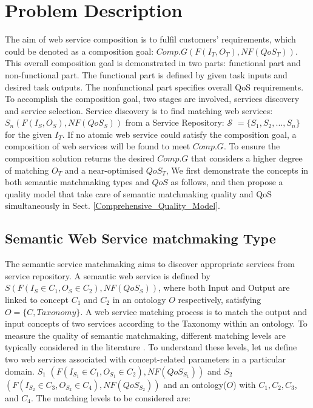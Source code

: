\documentclass{IEEEtran}
\begin{document}
\section{Problem Description}\label{problemDes}

The aim of web service composition is to fulfil customers' requirements, which could be denoted as a composition goal: $Comp.G(F(I_{T}, O_{T}), NF(QoS_{T}))$. This overall composition goal is demonstrated in two parts: functional part and non-functional part. The functional part is defined by given task inputs and desired task outputs. The nonfunctional part specifies overall QoS requirements. To accomplish the composition goal, two stages are involved, services discovery and service selection. Service discovery is to find matching web services: $S_{n}(F(I_{S}, O_{S}), NF(QoS_{S}))$ from a Service Repository: $\mathcal{S}$ $=  \{S_{1}, S_{2},..., S_{n} \}$ for the given $I_{T}$. If no atomic web service could satisfy the composition goal, a composition of web services will be found to meet $Comp.G$. To ensure the composition solution returns the desired $Comp.G$ that considers a higher degree of matching $O_{T}$ and a near-optimised $QoS_{T}$, We first demonstrate the concepts in both semantic matchmaking types and $QoS$ as follows, and then propose a quality model that take care of semantic matchmaking quality and QoS simultaneously in Sect. \ref{Comprehensive_Quality_Model}.


\subsection{Semantic Web Service matchmaking Type}\label{semantic Web service Discovery}
The semantic service matchmaking aims to discover appropriate services from service repository. A semantic web service is defined by $S(F(I_{S}\in C_{1}, O_{S}\in C_{2}), NF(QoS_{S}))$, where both Input and Output are linked to concept $C_{1}$ and $C_{2}$ in an ontology $O$ respectively, satisfying $O=\{C, Taxonomy\}$. A web service matching process is to match the output and input concepts of two services according to the Taxonomy within an ontology. To measure the quality of semantic matchmaking, different matching levels are typically considered in the literature \cite{paolucci2002semantic}. To understand these levels, let us define two web services associated with concept-related parameters in a particular domain. $S_{1}$ $(F(I_{S_1}\in C_{1}, O_{S_1}\in C_{2}), NF(QoS_{S_1}))$ and  $S_{2}$ $(F(I_{S_2}\in C_{3}, O_{S_2}\in C_{4}), NF(QoS_{S_2}))$ and an ontology($O$) with $C_{1},C_{2},C_{3}$, and $C_{4}$. The matching levels to be considered are:
\end{document}
